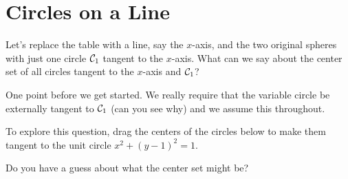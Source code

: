 \documentclass{ximera}
\begin{document}
\section{Circles on a Line}
\begin{exploration}
Let's replace the table with a line, say the $x$-axis, and the two original spheres with just one circle ${\cal C}_1$ tangent to the $x$-axis. What can we say about the center set of all circles tangent to the $x$-axis and ${\cal C}_1$?

One point before we get started. We really require that the variable circle be externally tangent to ${\cal C}_1$ (can you see why) and we assume this throughout.

To explore this question, drag the centers of the circles below to make them tangent to the unit circle $x^2 + (y-1)^2=1$.

Do  you have a guess about what the center set might be?

 
\begin{onlineOnly}
    \begin{center}
\end{center}
\end{onlineOnly}
\end{exploration}
\end{document}
